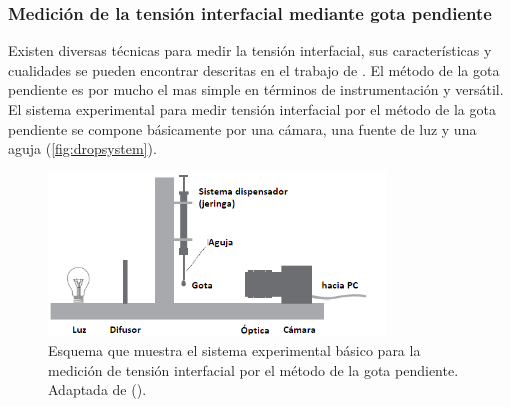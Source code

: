 \subsubsection{Medición de la tensión interfacial mediante gota pendiente}
Existen diversas técnicas para medir la tensión interfacial, sus características y cualidades se pueden encontrar descritas en el trabajo de \cite{Drelich2002}. El método de la gota pendiente es por mucho el mas simple en términos de instrumentación y versátil. El sistema experimental para medir tensión interfacial por el método de la gota pendiente se compone básicamente por una cámara, una fuente de luz y una aguja (\autoref{fig:dropsystem}).
\begin{figure}
    \includegraphics[width=0.8\textwidth]{Graphics/dropsystem.png}
    \caption[Sistema de medicion IFT]{Esquema que muestra el sistema experimental básico para la medición de tensión interfacial por el método de la gota pendiente. Adaptada de (\cite{Berry2015}).}
    \label{fig:dropsystem}
\end{figure}
